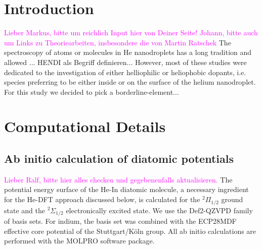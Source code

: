 \documentclass[twoside,twocolumn,9pt]{article}
\def\hl#1{\textcolor{magenta}{#1}}  %
\begin{document}
\renewcommand*\rmdefault{bch}\normalfont\upshape
\rmfamily
\section*{}
\vspace{-1cm}





\section{Introduction}
\hl{Lieber Markus, bitte um reichlich Input hier von Deiner Seite! Johann, bitte auch um Links zu Theoriearbeiten, insbesondere die von Martin Ratschek}
The spectroscopy of atoms or molecules in He nanodroplets has a long tradition and allowed ... 
HENDI als Begriff definieren...
However, most of these studies were dedicated to the investigation of either helliophilic or heliophobic dopants, i.e. species preferring to be either inside or on the surface of the helium nanodroplet. 
For this study we decided to pick a borderline-element...


\section{Computational Details}

\subsection{Ab initio calculation of diatomic potentials}
\hl{Lieber Ralf, bitte hier alles checken und gegebenenfalls aktualisieren.}
The potential energy surface of the He-In diatomic molecule, a necessary ingredient for the He-DFT approach discussed below, is calculated for  the $^2\Pi{}_{1/2}$ ground state and the $^2\Sigma{}_{1/2}$ electronically excited state. We use the Def2-QZVPD family of basis sets. \cite{Rappoport2010} For indium, the basis set was combined with the ECP28MDF effective core potential of the Stuttgart/K\"oln group.\cite{Metz2000}  All ab initio calculations are performed with the MOLPRO software package.\cite{MOLPRO}
\end{document}
